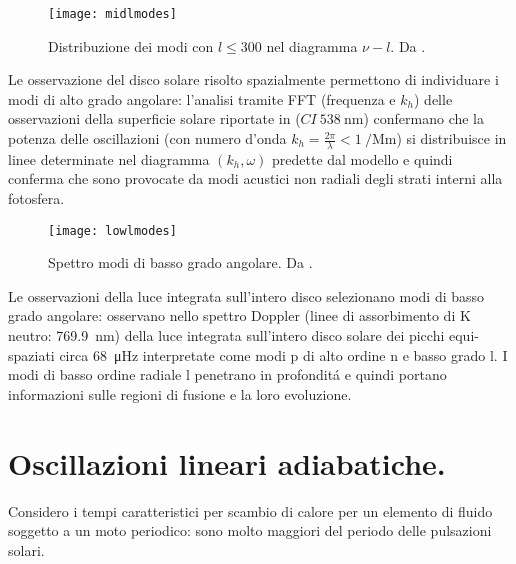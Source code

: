 \documentclass[../main.tex]{subfiles}
\begin{document}
\begin{minipage}[c][7cm][c]{\textwidth}

\begin{wrapfigure}[12]{r}{0.6\textwidth}
\centering
\texttt{[image: midlmodes]}
\caption{Distribuzione dei modi con $l\leq300$ nel diagramma $\nu-l$. Da \cite{chr02helioseismology}.}\label{fig:midlmodes}
\end{wrapfigure}

Le osservazione del disco solare risolto spazialmente permettono di individuare i modi di alto grado angolare: l'analisi tramite FFT (frequenza e $k_h$) delle osservazioni della superficie solare riportate in \citet{deu75observations} ($CI\ \SI{538}{\nano\meter}$) confermano che la  potenza delle oscillazioni (con numero d'onda $k_h=\frac{2\pi}{\lambda}<\SI{1}{\per\mega\meter}$) si distribuisce in linee determinate nel diagramma $(k_h,\omega)$ predette dal modello e quindi conferma che sono provocate da modi acustici non radiali degli strati interni alla fotosfera.

\end{minipage}

\begin{minipage}[c][7cm][t]{\textwidth}

\begin{wrapfigure}[11]{r}{0.6\textwidth}
\centering
\texttt{[image: lowlmodes]}
\caption{Spettro modi di basso grado angolare. Da \cite{chr02helioseismology}.}\label{fig:lowlmodes}
\end{wrapfigure}


Le osservazioni della luce integrata sull'intero disco selezionano modi di basso grado angolare: \citet{cla79solar} osservano nello spettro Doppler (linee di assorbimento di K neutro: \SI{769.9}{\nano\meter}) della luce integrata sull'intero disco solare dei picchi equi-spaziati circa \SI{68}{\micro\hertz} interpretate come modi p di alto ordine n e basso grado l. I modi di basso ordine radiale l penetrano in profondit\'a e quindi portano informazioni sulle regioni di fusione e la loro evoluzione.

\end{minipage}


\section{Oscillazioni lineari adiabatiche.}

Considero i tempi caratteristici per scambio di calore per un elemento di fluido soggetto a un moto periodico: sono molto maggiori del periodo delle pulsazioni solari.
\end{document}
